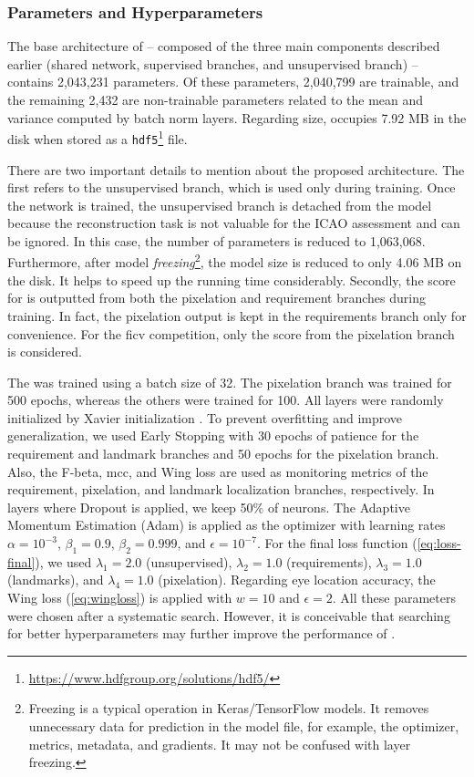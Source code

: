 \subsubsection{Parameters and Hyperparameters} \label{sec:hyperparams}
 
The base architecture of \methodname -- composed of the three main components described earlier (shared network, supervised branches, and unsupervised branch) -- contains 2,043,231 parameters. Of these parameters, 2,040,799 are trainable, and the remaining 2,432 are non-trainable parameters related to the mean and variance computed by batch norm layers. Regarding size, \methodname occupies 7.92 MB in the disk when stored as a \texttt{hdf5}\footnote{\url{https://www.hdfgroup.org/solutions/hdf5/}} file.
 
There are two important details to mention about the proposed architecture. The first refers to the unsupervised branch, which is used only during training. Once the network is trained, the unsupervised branch is detached from the model because the reconstruction task is not valuable for the ICAO assessment and can be ignored. In this case, the number of parameters is reduced to 1,063,068. Furthermore, after model \textit{freezing}\footnote{Freezing is a typical operation in Keras/TensorFlow models. It removes unnecessary data for prediction in the model file, for example, the optimizer, metrics, metadata, and gradients. It may not be confused with layer freezing.}, the model size is reduced to only 4.06 MB on the disk. It helps to speed up the running time considerably. Secondly, the score for \pixelation is outputted from both the pixelation and requirement branches during training. In fact, the pixelation output is kept in the requirements branch only for convenience. For the \acs{ficv} competition, only the score from the pixelation branch is considered.
 
The \methodname was trained using a batch size of 32. The pixelation branch was trained for 500 epochs, whereas the others were trained for 100. All layers were randomly initialized by Xavier initialization \citep{glorot2010understanding}. To prevent overfitting and improve generalization, we used Early Stopping with 30 epochs of patience for the requirement and landmark branches and 50 epochs for the pixelation branch. Also, the F-beta, \acs{mcc}, and Wing loss are used as monitoring metrics of the requirement, pixelation, and landmark localization branches, respectively. In layers where Dropout is applied, we keep 50\% of neurons. The Adaptive Momentum Estimation (Adam) is applied as the optimizer with learning rates $\alpha=10^{-3}$, $\beta_1=0.9$, $\beta_2=0.999$, and $\epsilon=10^{-7}$. For the final loss function (\autoref{eq:loss-final}), we used $\lambda_1=2.0$ (unsupervised), $\lambda_2=1.0$ (requirements), $\lambda_3=1.0$ (landmarks), and $\lambda_4=1.0$ (pixelation). Regarding eye location accuracy, the Wing loss (\autoref{eq:wingloss}) is applied with $w = 10$ and $\epsilon = 2$. All these parameters were chosen after a systematic search. However, it is conceivable that searching for better hyperparameters may further improve the performance of \methodname.
 
 
 